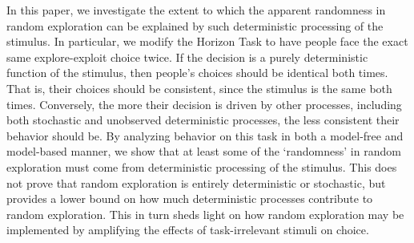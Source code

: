 \documentclass[12pt]{article}
\begin{document}
	
	
	
	In this paper, we investigate the extent to which the apparent randomness in random exploration can be explained by such deterministic processing of the stimulus. In particular, we modify the Horizon Task to have people face the exact same explore-exploit choice twice. If the decision is a purely deterministic function of the stimulus, then people's choices should be identical both times. That is, their choices should be consistent, since the stimulus is the same both times. Conversely, the more their decision is driven by other processes, including both stochastic and unobserved deterministic processes, the less consistent their behavior should be. By analyzing behavior on this task in both a model-free and model-based manner, we show that at least some of the `randomness' in random exploration must come from  deterministic processing of the stimulus.  This does not prove that random exploration is entirely deterministic or stochastic, but provides a lower bound on how much deterministic processes contribute to random exploration. This in turn sheds light on how random exploration may be implemented by amplifying the effects of task-irrelevant stimuli on choice.  
	
	
\end{document}

